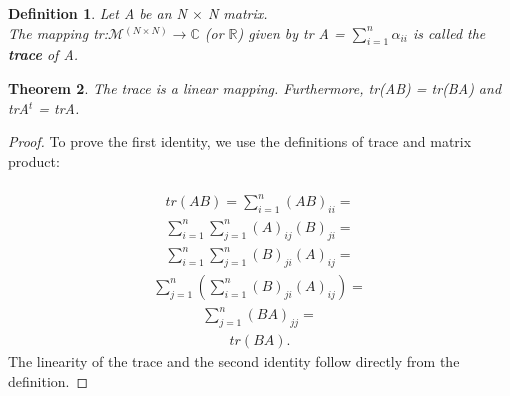 \documentclass[12pt,a4paper]{article}
\newtheorem{thm}{Theorem}
\newtheorem{defn}[thm]{Definition}
\begin{document}
\begin{defn}
Let A be an N $\times$ N matrix. \\The mapping tr:$\mathcal{M}$$^{(N\times N)}$$\to$$\mathbb{C}$ (or $\mathbb{R}$) given by tr A = $\sum_{i=1}^{n}$$ \alpha_{ii} $ is called the \textbf{trace} of A.
\end{defn}
\begin{thm}
The trace is a linear mapping. Furthermore, tr(AB) = tr(BA) and trA$^t$ = trA.
\end{thm}
\begin{proof}
To prove the first identity, we use the definitions of trace and matrix product:\\\\
\begin{align*}
tr(AB) = \sum_{i=1}^{n}(AB)_{ii} =
\end{align*}
\begin{align*}
\sum_{i=1}^{n} \sum_{j=1}^{n}(A)_{ij}(B)_{ji} =
\end{align*}
\begin{align*}
\sum_{i=1}^{n} \sum_{j=1}^{n}(B)_{ji}(A)_{ij} =
\end{align*}
\begin{align*}
 \sum_{j=1}^{n} ( \sum_{i=1}^{n}(B)_{ji}(A)_{ij}) =
 \end{align*}
\begin{align*}
\sum_{j=1}^{n}(BA)_{jj} =
\end{align*}
\begin{align*}
tr(BA).
\end{align*}
The linearity of the trace and the second identity follow directly from the definition.
\end{proof}
\end{document}
